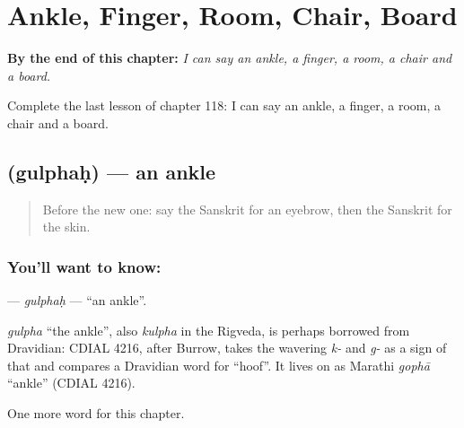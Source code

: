 
\chapter{Ankle, Finger, Room, Chair, Board}
\label{ch:sa-ankle-finger-room-chair-board}

\begin{chapteropening}
\textbf{By the end of this chapter:} \emph{I can say an ankle, a finger, a room, a chair and a board.}

Complete the last lesson of chapter 118: I can say an ankle, a finger, a room, a chair and a board.
\end{chapteropening}

\section[\texorpdfstring{\sk{गुल्फः} (gulphaḥ)}{गुल्फः (gulphaḥ)}]{ (gulphaḥ) — an ankle}

\label{lesson:SA-C118-gulphah}



\begin{quote}
Before the new one: say the Sanskrit for an eyebrow, then the Sanskrit for the skin.
\end{quote}

\subsection*{You'll want to know: }
\textbf{} — \emph{gulphaḥ} — \textquotedblleft{}an ankle\textquotedblright{}.

\begin{cousinweb}
\emph{gulpha} \textquotedblleft{}the ankle\textquotedblright{}, also \emph{kulpha} in the Rigveda, is perhaps borrowed from Dravidian: CDIAL 4216, after Burrow, takes the wavering \emph{k-} and \emph{g-} as a sign of that and compares a Dravidian word for \textquotedblleft{}hoof\textquotedblright{}. It lives on as Marathi \emph{gophā} \textquotedblleft{}ankle\textquotedblright{} (CDIAL 4216).
\end{cousinweb}

\begin{grammarlens}[title={What you've built}]
One more word for this chapter.
\end{grammarlens}

